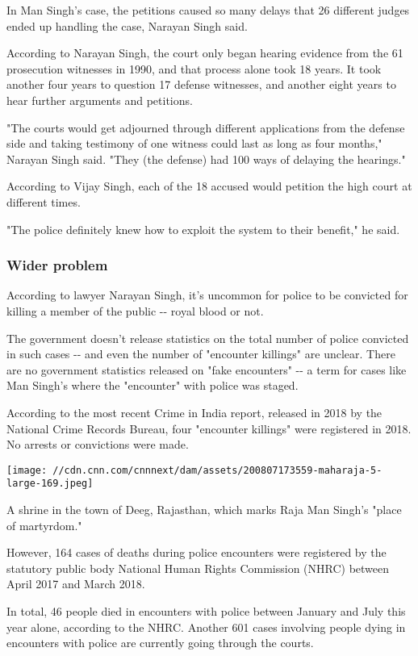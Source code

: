 In Man Singh's case, the petitions caused so many delays that 26
different judges ended up handling the case, Narayan Singh said.

According to Narayan Singh, the court only began hearing evidence from
the 61 prosecution witnesses in 1990, and that process alone took 18
years. It took another four years to question 17 defense witnesses, and
another eight years to hear further arguments and petitions.

"The courts would get adjourned through different applications from the
defense side and taking testimony of one witness could last as long as
four months," Narayan Singh said. "They (the defense) had 100 ways of
delaying the hearings."

According to Vijay Singh, each of the 18 accused would petition the high
court at different times.

"The police definitely knew how to exploit the system to their benefit,"
he said.

\hypertarget{wider-problem}{%
\subsubsection{Wider problem}\label{wider-problem}}

According to lawyer Narayan Singh, it's uncommon for police to be
convicted for killing a member of the public -\/- royal blood or not.

The government doesn't release statistics on the total number of police
convicted in such cases -\/- and even the number of "encounter killings"
are unclear. There are no government statistics released on "fake
encounters" -\/- a term for cases like Man Singh's where the "encounter"
with police was staged.

According to the most recent Crime in India report, released in 2018 by
the National Crime Records Bureau, four "encounter killings" were
registered in 2018. No arrests or convictions were made.

\texttt{[image: //cdn.cnn.com/cnnnext/dam/assets/200807173559-maharaja-5-large-169.jpeg]}

A shrine in the town of Deeg, Rajasthan, which marks Raja Man Singh's
"place of martyrdom."

However, 164 cases of deaths during police encounters were registered by
the statutory public body National Human Rights Commission (NHRC)
between April 2017 and March 2018.

In total, 46 people died in encounters with police between January and
July this year alone, according to the NHRC. Another 601 cases involving
people dying in encounters with police are currently going through the
courts.

